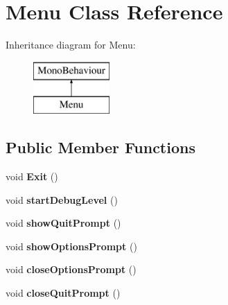 \hypertarget{class_menu}{}\section{Menu Class Reference}
\label{class_menu}
Inheritance diagram for Menu\+:\begin{figure}[H]
\begin{center}
\leavevmode
\includegraphics[height=2.000000cm]{class_menu}
\end{center}
\end{figure}
\subsection*{Public Member Functions}
\begin{DoxyCompactItemize}
\item 
\hypertarget{class_menu_a6bed6c06cac304537254a3a3f21bd549}{}void {\bfseries Exit} ()\label{class_menu_a6bed6c06cac304537254a3a3f21bd549}

\item 
\hypertarget{class_menu_aa2591599d20b934c020003e26032e5ba}{}void {\bfseries start\+Debug\+Level} ()\label{class_menu_aa2591599d20b934c020003e26032e5ba}

\item 
\hypertarget{class_menu_aba4e9830df8e829cb94351b88ea00f26}{}void {\bfseries show\+Quit\+Prompt} ()\label{class_menu_aba4e9830df8e829cb94351b88ea00f26}

\item 
\hypertarget{class_menu_a11add8024959f214c0d9938a7590818f}{}void {\bfseries show\+Options\+Prompt} ()\label{class_menu_a11add8024959f214c0d9938a7590818f}

\item 
\hypertarget{class_menu_a4a0f46ac24e89d073c945d88cf545b6b}{}void {\bfseries close\+Options\+Prompt} ()\label{class_menu_a4a0f46ac24e89d073c945d88cf545b6b}

\item 
\hypertarget{class_menu_a4544015692acbddeffba5279991f4c7c}{}void {\bfseries close\+Quit\+Prompt} ()\label{class_menu_a4544015692acbddeffba5279991f4c7c}

\end{DoxyCompactItemize}

